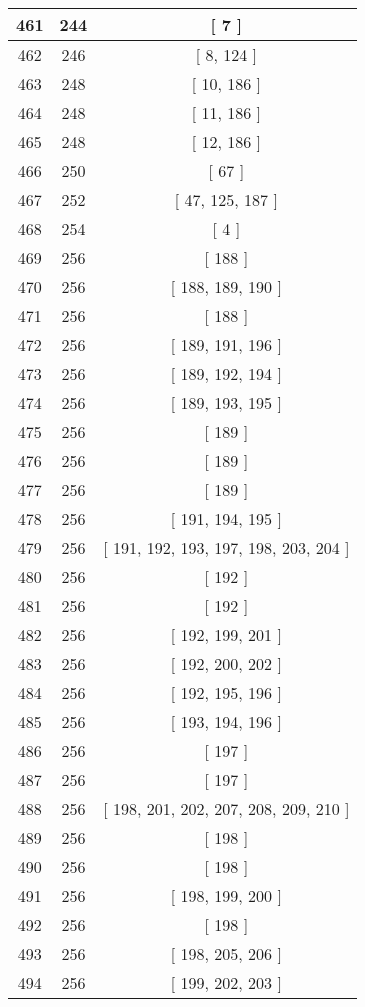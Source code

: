 \begin{center}
\begin{longtable}[H]{|| c c c ||}
\hline
461 & 244 & [ 7 ] \\ 
\hline
462 & 246 & [ 8, 124 ] \\ 
\hline
463 & 248 & [ 10, 186 ] \\ 
\hline
464 & 248 & [ 11, 186 ] \\ 
\hline
465 & 248 & [ 12, 186 ] \\ 
\hline
466 & 250 & [ 67 ] \\ 
\hline
467 & 252 & [ 47, 125, 187 ] \\ 
\hline
468 & 254 & [ 4 ] \\ 
\hline
469 & 256 & [ 188 ] \\ 
\hline
470 & 256 & [ 188, 189, 190 ] \\ 
\hline
471 & 256 & [ 188 ] \\ 
\hline
472 & 256 & [ 189, 191, 196 ] \\ 
\hline
473 & 256 & [ 189, 192, 194 ] \\ 
\hline
474 & 256 & [ 189, 193, 195 ] \\ 
\hline
475 & 256 & [ 189 ] \\ 
\hline
476 & 256 & [ 189 ] \\ 
\hline
477 & 256 & [ 189 ] \\ 
\hline
478 & 256 & [ 191, 194, 195 ] \\ 
\hline
479 & 256 & [ 191, 192, 193, 197, 198, 203, 204 ] \\ 
\hline
480 & 256 & [ 192 ] \\ 
\hline
481 & 256 & [ 192 ] \\ 
\hline
482 & 256 & [ 192, 199, 201 ] \\ 
\hline
483 & 256 & [ 192, 200, 202 ] \\ 
\hline
484 & 256 & [ 192, 195, 196 ] \\ 
\hline
485 & 256 & [ 193, 194, 196 ] \\ 
\hline
486 & 256 & [ 197 ] \\ 
\hline
487 & 256 & [ 197 ] \\ 
\hline
488 & 256 & [ 198, 201, 202, 207, 208, 209, 210 ] \\ 
\hline
489 & 256 & [ 198 ] \\ 
\hline
490 & 256 & [ 198 ] \\ 
\hline
491 & 256 & [ 198, 199, 200 ] \\ 
\hline
492 & 256 & [ 198 ] \\ 
\hline
493 & 256 & [ 198, 205, 206 ] \\ 
\hline
494 & 256 & [ 199, 202, 203 ] \\ 

\end{longtable}
\end{center}
